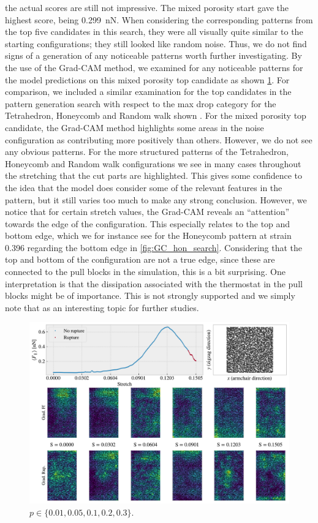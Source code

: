 the actual scores are still not impressive. The mixed porosity start gave the
highest score, being \SI{0.299}{nN}. When considering the corresponding patterns
from the top five candidates in this search, they were all visually quite
similar to the starting configurations; they still looked like random noise.
Thus, we do not find signs of a generation of any noticeable patterns worth
further investigating. By the use of the Grad-CAM method, we examined for any
noticeable patterns for the model predictions on this mixed porosity top
candidate as shown  \cref{fig:GC_mixed_p}. For comparison, we included a similar
examination for the top candidates in the pattern generation search with respect
to the max drop category for the Tetrahedron, Honeycomb and Random walk shown
. For the mixed porosity top
candidate, the Grad-CAM method highlights some areas in the noise configuration as
contributing more positively than others. However, we do not see any obvious
patterns. For the more structured patterns of the Tetrahedron, Honeycomb and
Random walk configurations we see in many cases throughout the stretching that
the cut parts are highlighted. This gives some confidence to the idea that the
model does consider some of the relevant features in the pattern, but it still
varies too much to make any strong conclusion. However, we notice that for
certain stretch values, the Grad-CAM reveals an ``attention'' towards the edge of
the configuration. This especially relates to the top and bottom edge, which we for instance see for the Honeycomb pattern at strain 0.396 regarding the bottom edge in \cref{fig:GC_hon_search}. Considering that the top and bottom of the configuration are not a true edge, since these are connected to the pull blocks in the simulation, this is a bit surprising. One interpretation is that the dissipation associated with the thermostat in the pull blocks might be of importance. This is not strongly supported and we simply note that as an interesting topic for further studies.


\begin{figure}[H]
  \centering
  \includegraphics[width=0.8\linewidth]{figures/search/grad_cam_GA_RN_start_top0.pdf}
  \caption{$p \in \{0.01, 0.05, 0.1, 0.2, 0.3\}$.}
  \label{fig:GC_mixed_p}
\end{figure}  

